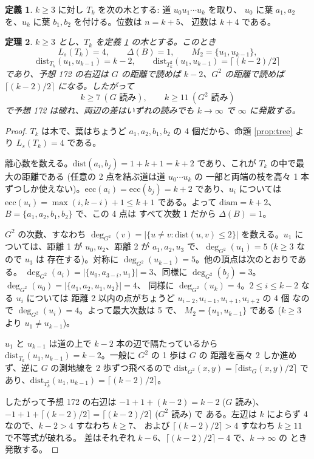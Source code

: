 \documentclass[paper=a4,fontsize=10.5pt,jafontsize=10.5pt]{jlreq}
\theoremstyle{plain}
\newtheorem{theorem}{定理}[section]
\theoremstyle{definition}
\newtheorem{definition}[theorem]{定義}
\begin{document}
\begin{definition}\label{def:tk}
$k \ge 3$ に対し $T_k$ を次の木とする: 道 $u_0 u_1 \cdots u_k$ を取り、
$u_0$ に葉 $a_1, a_2$ を、$u_k$ に葉 $b_1, b_2$ を付ける。位数は $n = k + 5$、
辺数は $k + 4$ である。
\end{definition}

\begin{theorem}\label{thm:172}
$k \ge 3$ とし、$T_k$ を定義 \ref{def:tk} の木とする。このとき
\[ L_s(T_k) = 4, \qquad \Delta(B) = 1, \qquad M_2 = \{u_1, u_{k-1}\}, \]
\[ \mathrm{dist}_{T_k}(u_1, u_{k-1}) = k - 2, \qquad
   \mathrm{dist}_{T_k^2}(u_1, u_{k-1}) = \lceil (k-2)/2 \rceil \]
であり、予想 172 の右辺は $G$ の距離で読めば $k - 2$、$G^2$ の距離で読めば
$\lceil (k-2)/2 \rceil$ になる。したがって
\[ k \ge 7 \ (\text{$G$ 読み}), \qquad k \ge 11 \ (\text{$G^2$ 読み}) \]
で予想 172 は破れ、両辺の差はいずれの読みでも $k \to \infty$ で
$\infty$ に発散する。
\end{theorem}

\begin{proof}
$T_k$ は木で、葉はちょうど $a_1, a_2, b_1, b_2$ の 4 個だから、命題
\ref{prop:tree} より $L_s(T_k) = 4$ である。

離心数を数える。$\mathrm{dist}(a_i, b_j) = 1 + k + 1 = k + 2$ であり、これが
$T_k$ の中で最大の距離である (任意の 2 点を結ぶ道は道 $u_0 \cdots u_k$ の
一部と両端の枝を高々 1 本ずつしか使えない)。$\mathrm{ecc}(a_i) =
\mathrm{ecc}(b_j) = k + 2$ であり、$u_i$ については
$\mathrm{ecc}(u_i) = \max(i, k-i) + 1 \le k + 1$ である。よって
$\mathrm{diam} = k + 2$、$B = \{a_1, a_2, b_1, b_2\}$ で、この 4 点は
すべて次数 1 だから $\Delta(B) = 1$。

$G^2$ の次数、すなわち $\deg_{G^2}(v) = |\{u \ne v : \mathrm{dist}(u,v)
\le 2\}|$ を数える。$u_1$ については、距離 1 が $u_0, u_2$、距離 2 が
$a_1, a_2, u_3$ で、$\deg_{G^2}(u_1) = 5$ ($k \ge 3$ なので $u_3$ は
存在する)。対称に
$\deg_{G^2}(u_{k-1}) = 5$。他の頂点は次のとおりである。
$\deg_{G^2}(a_i) = |\{u_0, a_{3-i}, u_1\}| = 3$、同様に
$\deg_{G^2}(b_j) = 3$。$\deg_{G^2}(u_0) = |\{a_1, a_2, u_1, u_2\}| = 4$、
同様に $\deg_{G^2}(u_k) = 4$。$2 \le i \le k-2$ なる $u_i$ については
距離 2 以内の点がちょうど $u_{i-2}, u_{i-1}, u_{i+1}, u_{i+2}$ の 4 個
なので $\deg_{G^2}(u_i) = 4$。よって最大次数は 5 で、
$M_2 = \{u_1, u_{k-1}\}$ である ($k \ge 3$ より $u_1 \ne u_{k-1}$)。

$u_1$ と $u_{k-1}$ は道の上で $k - 2$ 本の辺で隔たっているから
$\mathrm{dist}_{T_k}(u_1, u_{k-1}) = k - 2$。一般に $G^2$ の 1 歩は $G$ の
距離を高々 2 しか進めず、逆に $G$ の測地線を 2 歩ずつ飛べるので
$\mathrm{dist}_{G^2}(x,y) = \lceil \mathrm{dist}_G(x,y)/2 \rceil$ で
あり、$\mathrm{dist}_{T_k^2}(u_1, u_{k-1}) = \lceil (k-2)/2 \rceil$。

したがって予想 172 の右辺は $-1 + 1 + (k-2) = k - 2$ ($G$ 読み)、
$-1 + 1 + \lceil (k-2)/2 \rceil = \lceil (k-2)/2 \rceil$ ($G^2$ 読み) で
ある。左辺は $k$ によらず 4 なので、$k - 2 > 4$ すなわち $k \ge 7$、
および $\lceil (k-2)/2 \rceil > 4$ すなわち $k \ge 11$ で不等式が破れる。
差はそれぞれ $k - 6$、$\lceil (k-2)/2 \rceil - 4$ で、$k \to \infty$ の
とき発散する。
\end{proof}
\end{document}
